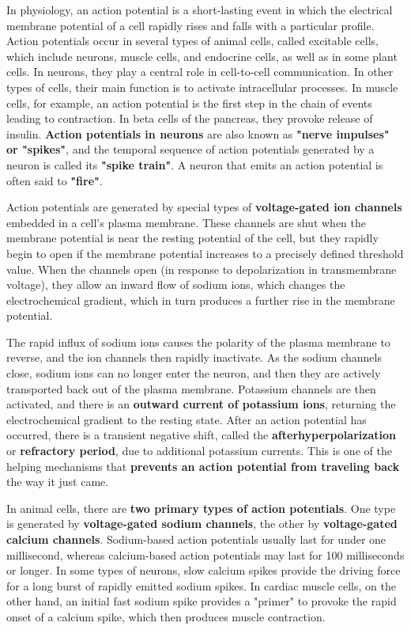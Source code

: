 In physiology, an action potential is a short-lasting event in which the electrical membrane potential of a cell rapidly rises and falls with a particular profile. 
Action potentials occur in several types of animal cells, called excitable cells, which include neurons, muscle cells, and endocrine cells, as well as in some plant cells. 
In neurons, they play a central role in cell-to-cell communication. 
In other types of cells, their main function is to activate intracellular processes. 
In muscle cells, for example, an action potential is the first step in the chain of events leading to contraction. 
In beta cells of the pancreas, they provoke release of insulin. 
\textbf{Action potentials in neurons} are also known as \textbf{"nerve impulses" or "spikes"}, and the temporal sequence of action potentials generated by a neuron is called its \textbf{"spike train"}. 
A neuron that emits an action potential is often said to \textbf{"fire"}.


   Action potentials are generated by special types of \textbf{voltage-gated ion channels} embedded in a cell's plasma membrane. These channels are shut when the membrane potential is near the resting potential of the cell, but they rapidly begin to open if the membrane potential increases to a precisely defined threshold value. When the channels open (in response to depolarization in transmembrane voltage), they allow an inward flow of sodium ions, which changes the electrochemical gradient, which in turn produces a further rise in the membrane potential.
   
    The rapid influx of sodium ions causes the polarity of the plasma membrane to reverse, and the ion channels then rapidly inactivate. As the sodium channels close, sodium ions can no longer enter the neuron, and then they are actively transported back out of the plasma membrane. Potassium channels are then activated, and there is an \textbf{outward current of potassium ions}, returning the electrochemical gradient to the resting state. After an action potential has occurred, there is a transient negative shift, called the \textbf{afterhyperpolarization} or \textbf{refractory period}, due to additional potassium currents. This is one of the helping mechanisms that \textbf{prevents an action potential from traveling back} the way it just came.
    
    In animal cells, there are \textbf{two primary types of action potentials}. One type is generated by \textbf{voltage-gated sodium channels}, the other by\textbf{ voltage-gated calcium channels}. Sodium-based action potentials usually last for under one millisecond, whereas calcium-based action potentials may last for 100 milliseconds or longer. In some types of neurons, slow calcium spikes provide the driving force for a long burst of rapidly emitted sodium spikes. In cardiac muscle cells, on the other hand, an initial fast sodium spike provides a "primer" to provoke the rapid onset of a calcium spike, which then produces muscle contraction.



